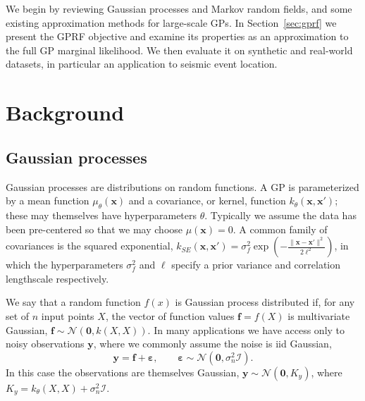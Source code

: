 \documentclass{article}
\newcommand{\N}{\mathcal{N}}
\newcommand{\I}{\mathcal{I}}
\newcommand{\eps}{\varepsilon}
\renewcommand{\v}[1]{\mathbf{#1}}
\begin{document}
We begin by reviewing Gaussian processes and Markov random fields, and
some existing approximation methods for large-scale GPs. In
Section~\ref{sec:gprf} we present the GPRF objective and examine its
properties as an approximation to the full GP marginal likelihood.  We
then evaluate it on synthetic and real-world datasets, in particular
an application to seismic event location. 

\section{Background}

\subsection{Gaussian processes}
Gaussian processes \citep{rasmussen2006} are
distributions on random functions. A GP is parameterized by a mean function
$\mu_\theta(\v{x})$ and a covariance, or kernel, function $k_\theta(\v{x},
\v{x}')$; these may themselves have hyperparameters $\theta$. Typically we assume the data has been pre-centered so that
we may choose $\mu(\v{x})=0$. A common family of covariances is the squared
exponential, $k_{SE}(\v{x}, \v{x}') =
\sigma^2_f\exp\left(-\frac{\|\v{x}-\v{x}'\|^2}{2\ell^2}\right)$, in
which the hyperparameters $\sigma^2_f$  and $\ell$ specify a prior variance
and correlation lengthscale respectively.

We say that a random function $f(x)$ is Gaussian process distributed if, for
any set of $n$ input points $X$, the vector of function values $\v{f} = f(X)$ is
multivariate Gaussian, $\v{f} \sim \N(\v{0}, k(X, X)).$ In many applications we
have access only to noisy observations $\v{y}$, where we commonly
assume the noise is iid Gaussian, \[\v{y} = \v{f} + \v{\eps},
\qquad \v{\eps}\sim \N(\v{0}, \sigma_n^2 \I).\] In this case the
observations are themselves Gaussian, $\v{y} \sim \N(\v{0}, K_y)$, where $K_y = k_\theta(X, X) + \sigma^2_n\I$. 
\end{document}
